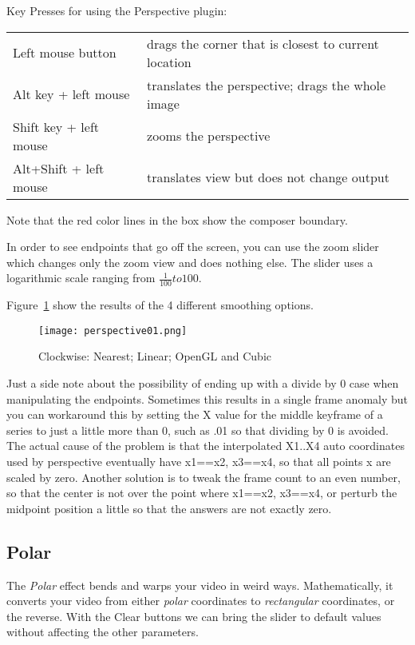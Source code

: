 Key Presses for using the Perspective plugin:

\begin{tabular}{l l}
    \toprule
    Left mouse button & drags the corner that is closest to current location \\
    Alt key + left mouse & translates the perspective; drags the whole image \\
    Shift key + left mouse & zooms the perspective \\
    Alt+Shift + left mouse & translates view but does not change output \\
    \bottomrule
\end{tabular}

Note that the red color lines in the box show the composer boundary.

In order to see endpoints that go off the screen, you can use the zoom slider which changes only the zoom view and does nothing else. The slider uses a logarithmic scale ranging from $\frac{1}{100} to 100$.

Figure~\ref{fig:perspective01} show the results of the 4 different smoothing options.

\begin{figure}[hbtp]
    \centering
    \texttt{[image: perspective01.png]}
    \caption{Clockwise: Nearest; Linear; OpenGL and Cubic}
    \label{fig:perspective01}
\end{figure}

Just a side note about the possibility of ending up with a divide by 0 case when manipulating
the endpoints.  Sometimes this results in a single frame anomaly but you can workaround this
by setting the X value for the middle keyframe of a series to just a little more than 0,
such as .01 so that dividing by 0 is avoided. The actual cause of the problem is that the
interpolated X1..X4 auto coordinates used by perspective eventually have x1==x2, x3==x4, so
that all points x are scaled by zero. Another solution is to tweak the frame count to an even
number, so that the center is not over the point where x1==x2, x3==x4, or perturb the midpoint
position a little so that the answers are not exactly zero.

\subsection{Polar}%
\label{sub:polar}

The \textit{Polar} effect bends and warps your video in weird ways. Mathematically, it converts your video from either \textit{polar} coordinates to \textit{rectangular} coordinates, or the reverse. With the Clear buttons we can bring the slider to default values without affecting the other parameters.

